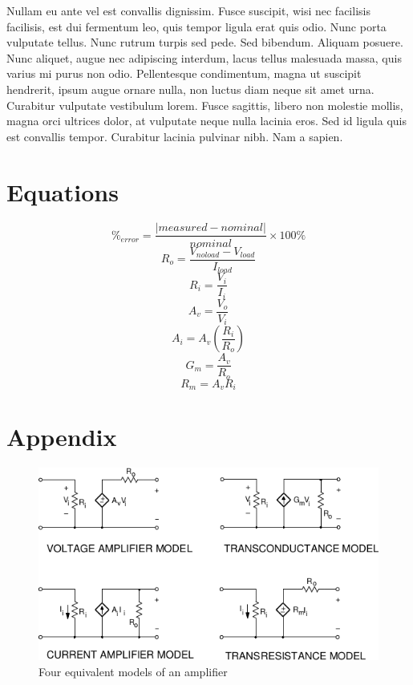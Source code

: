 \documentclass{article}
\begin{document}
Nullam eu ante vel est convallis dignissim. Fusce suscipit, wisi nec
facilisis facilisis, est dui fermentum leo, quis tempor ligula erat
quis odio. Nunc porta vulputate tellus. Nunc rutrum turpis sed
pede. Sed bibendum. Aliquam posuere. Nunc aliquet, augue nec
adipiscing interdum, lacus tellus malesuada massa, quis varius mi
purus non odio. Pellentesque condimentum, magna ut suscipit hendrerit,
ipsum augue ornare nulla, non luctus diam neque sit amet
urna. Curabitur vulputate vestibulum lorem. Fusce sagittis, libero non
molestie mollis, magna orci ultrices dolor, at vulputate neque nulla
lacinia eros. Sed id ligula quis est convallis tempor. Curabitur
lacinia pulvinar nibh. Nam a sapien.

\section*{Equations}

\[\%_{error} = \frac{|measured - nominal|}{nominal} \times 100\%\]
\[R_o = \frac{V_{noload} - V_{load}}{I_{load}}\]
\[R_i = \frac{V_i}{I_i}\]
\[A_v = \frac{V_o}{V_i}\]
\[A_i = A_v \left(\frac{R_i}{R_o}\right)\]
\[G_m = \frac{A_v}{R_o}\]
\[R_m = A_v R_i\]

\section{Appendix}
\label{sec:appendix}

\begin{figure}[h]
  \centering
  \includegraphics[]{img/amp_models}
  \caption{Four equivalent models of an amplifier}
  \label{fig:amp_models}
\end{figure}
\end{document}

